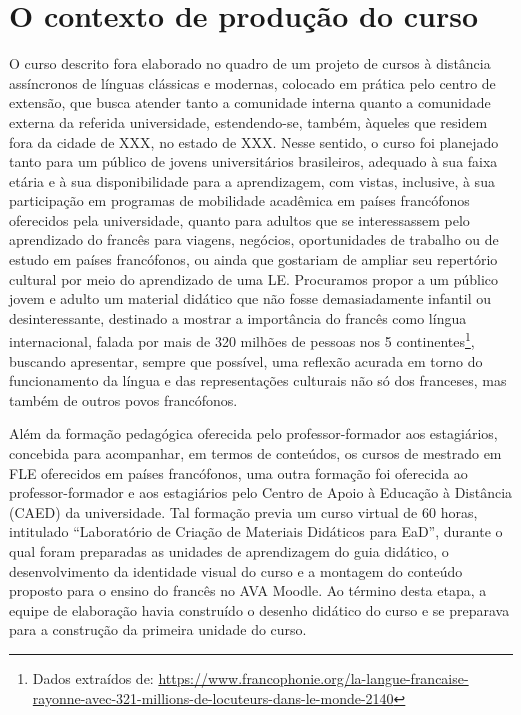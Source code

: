 \section{O contexto de produção do curso}\label{sec-ocontexto}

O curso descrito fora elaborado no quadro de um projeto de cursos à
distância assíncronos de línguas clássicas e modernas, colocado em
prática pelo centro de extensão, que busca atender tanto a comunidade
interna quanto a comunidade externa da referida universidade,
estendendo-se, também, àqueles que residem fora da cidade de XXX, no
estado de XXX. Nesse sentido, o curso foi planejado tanto para um
público de jovens universitários brasileiros, adequado à sua faixa
etária e à sua disponibilidade para a aprendizagem, com vistas,
inclusive, à sua participação em programas de mobilidade acadêmica em
países francófonos oferecidos pela universidade, quanto para adultos que
se interessassem pelo aprendizado do francês para viagens, negócios,
oportunidades de trabalho ou de estudo em países francófonos, ou ainda
que gostariam de ampliar seu repertório cultural por meio do aprendizado
de uma LE. Procuramos propor a um público jovem e adulto um material
didático que não fosse demasiadamente infantil ou desinteressante,
destinado a mostrar a importância do francês como língua internacional,
falada por mais de 320 milhões de pessoas nos 5 continentes\footnote{Dados
	extraídos de:
	\url{https://www.francophonie.org/la-langue-francaise-rayonne-avec-321-millions-de-locuteurs-dans-le-monde-2140}},
buscando apresentar, sempre que possível, uma reflexão acurada em torno
do funcionamento da língua e das representações culturais não só dos
franceses, mas também de outros povos francófonos.

Além da formação pedagógica oferecida pelo professor-formador aos
estagiários, concebida para acompanhar, em termos de conteúdos, os
cursos de mestrado em FLE oferecidos em países francófonos, uma outra
formação foi oferecida ao professor-formador e aos estagiários pelo
Centro de Apoio à Educação à Distância (CAED) da universidade. Tal
formação previa um curso virtual de 60 horas, intitulado \enquote{Laboratório
de Criação de Materiais Didáticos para EaD}, durante o qual foram
preparadas as unidades de aprendizagem do guia didático, o
desenvolvimento da identidade visual do curso e a montagem do conteúdo
proposto para o ensino do francês no AVA Moodle. Ao término desta etapa,
a equipe de elaboração havia construído o desenho didático do curso e se
preparava para a construção da primeira unidade do curso.


